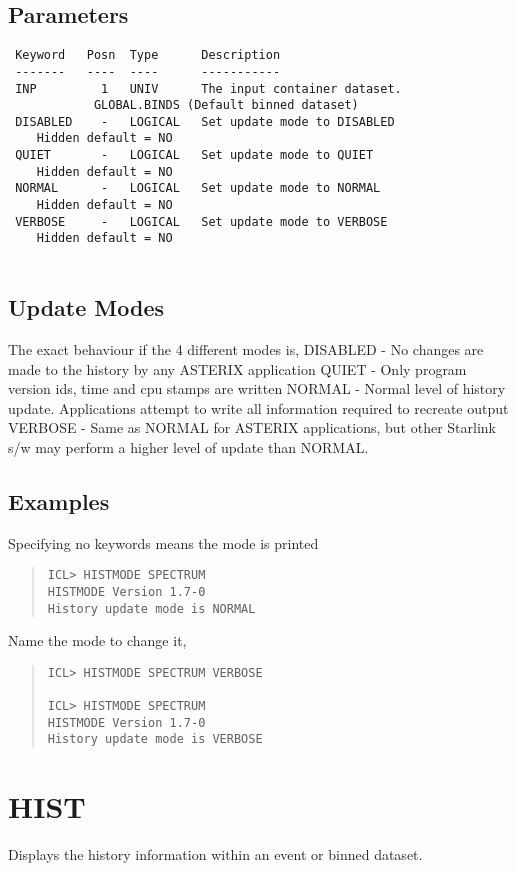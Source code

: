 \documentclass{book}
\renewcommand{\_}{{\tt\char'137}}     %
\begin{document}
\subsection{Parameters}
\begin{verbatim}
 Keyword   Posn  Type      Description
 -------   ----  ----      -----------
 INP         1   UNIV      The input container dataset.
            GLOBAL.BINDS (Default binned dataset)
 DISABLED    -   LOGICAL   Set update mode to DISABLED
    Hidden default = NO
 QUIET       -   LOGICAL   Set update mode to QUIET
    Hidden default = NO
 NORMAL      -   LOGICAL   Set update mode to NORMAL
    Hidden default = NO
 VERBOSE     -   LOGICAL   Set update mode to VERBOSE
    Hidden default = NO
 
\end{verbatim}\subsection{Update Modes}
The exact behaviour if the 4 different modes is,
DISABLED - No changes are made to the history by
any ASTERIX application
QUIET - Only program version ids, time and cpu
stamps are written
NORMAL - Normal level of history update.
Applications attempt to write all
information required to recreate output
VERBOSE - Same as NORMAL for ASTERIX applications,
but other Starlink s/w may perform a
higher level of update than NORMAL.
\subsection{Examples}
Specifying no keywords means the mode is printed
 
\begin{quote}\begin{verbatim}
ICL> HISTMODE SPECTRUM
HISTMODE Version 1.7-0
History update mode is NORMAL
\end{verbatim}\end{quote}
Name the mode to change it,
 
\begin{quote}\begin{verbatim}
ICL> HISTMODE SPECTRUM VERBOSE
 
ICL> HISTMODE SPECTRUM
HISTMODE Version 1.7-0
History update mode is VERBOSE
\end{verbatim}\end{quote}
\section{HIST}
Displays the history information within an event or binned
dataset.
 
\end{document}
